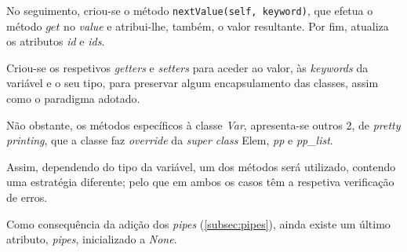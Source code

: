 \documentclass[../relatorio.tex]{subfiles}
\begin{document}
    No seguimento, criou-se o método \texttt{nextValue(self, keyword)}, que 
    efetua o método $get$ no \textit{value} e atribui-lhe, também, o valor resultante.
    Por fim, atualiza os atributos \textit{id} e \textit{ids}.

    Criou-se os respetivos \textit{getters} e \textit{setters} para aceder ao valor, às 
    \textit{keywords} da variável e o seu tipo, para preservar algum encapsulamento das classes,
    assim como o paradigma adotado.

    Não obstante, os métodos específicos à classe \textit{Var}, apresenta-se outros 2,
    de \textit{pretty printing}, que a classe faz \textit{override} da \textit{super class} Elem,
    \textit{pp} e \textit{pp\_list}.
    
    Assim, dependendo do tipo da variável, um dos métodos será utilizado, contendo uma 
    estratégia diferente; pelo que em ambos os casos têm a respetiva verificação de erros.

    Como consequência da adição dos \textit{pipes} (\ref{subsec:pipes}), ainda existe um último 
    atributo, \textit{pipes}, inicializado a \textit{None}.
\end{document}
